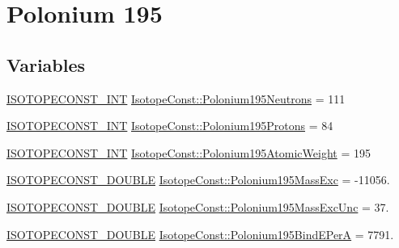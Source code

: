 \hypertarget{group___isotope_const-_polonium-_po195}{}\section{Polonium 195}
\label{group___isotope_const-_polonium-_po195}
\subsection*{Variables}
\begin{DoxyCompactItemize}
\item 
\mbox{\hyperlink{group___isotope_const-_macros_ga5f18360b3e99483a35c32d789e62621c}{I\+S\+O\+T\+O\+P\+E\+C\+O\+N\+S\+T\+\_\+\+I\+NT}} \mbox{\hyperlink{group___isotope_const-_polonium-_po195_gab2114bfb09dc3983927bd20e2af1a9da}{Isotope\+Const\+::\+Polonium195\+Neutrons}} = 111
\item 
\mbox{\hyperlink{group___isotope_const-_macros_ga5f18360b3e99483a35c32d789e62621c}{I\+S\+O\+T\+O\+P\+E\+C\+O\+N\+S\+T\+\_\+\+I\+NT}} \mbox{\hyperlink{group___isotope_const-_polonium-_po195_gace0fe48cfbff6b9f3c9759d2aafa2f9a}{Isotope\+Const\+::\+Polonium195\+Protons}} = 84
\item 
\mbox{\hyperlink{group___isotope_const-_macros_ga5f18360b3e99483a35c32d789e62621c}{I\+S\+O\+T\+O\+P\+E\+C\+O\+N\+S\+T\+\_\+\+I\+NT}} \mbox{\hyperlink{group___isotope_const-_polonium-_po195_ga39da9b17eabfef9bde3604ae85f47f5e}{Isotope\+Const\+::\+Polonium195\+Atomic\+Weight}} = 195
\item 
\mbox{\hyperlink{group___isotope_const-_macros_ga8f45a7272ce02c0b4c65c44636ed719a}{I\+S\+O\+T\+O\+P\+E\+C\+O\+N\+S\+T\+\_\+\+D\+O\+U\+B\+LE}} \mbox{\hyperlink{group___isotope_const-_polonium-_po195_ga5d5246941959948d65efbc6618e35443}{Isotope\+Const\+::\+Polonium195\+Mass\+Exc}} = -\/11056.
\item 
\mbox{\hyperlink{group___isotope_const-_macros_ga8f45a7272ce02c0b4c65c44636ed719a}{I\+S\+O\+T\+O\+P\+E\+C\+O\+N\+S\+T\+\_\+\+D\+O\+U\+B\+LE}} \mbox{\hyperlink{group___isotope_const-_polonium-_po195_ga912af2ad122043613400409d711b0128}{Isotope\+Const\+::\+Polonium195\+Mass\+Exc\+Unc}} = 37.
\item 
\mbox{\hyperlink{group___isotope_const-_macros_ga8f45a7272ce02c0b4c65c44636ed719a}{I\+S\+O\+T\+O\+P\+E\+C\+O\+N\+S\+T\+\_\+\+D\+O\+U\+B\+LE}} \mbox{\hyperlink{group___isotope_const-_polonium-_po195_gaf39d9f7d25ce7554eb5db1b55817810c}{Isotope\+Const\+::\+Polonium195\+Bind\+E\+PerA}} = 7791.
\item 

\end{DoxyCompactItemize}
